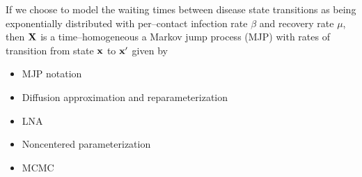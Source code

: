If we choose to model the waiting times between disease state transitions as being exponentially distributed with per--contact infection rate $ \beta $ and recovery rate $ \mu $, then $ \mathbf{X} $ is a time--homogeneous a Markov jump process (MJP) with rates of transition from state $ \mathbf{x} $ to $ \mathbf{x}^\prime $ given by


\begin{itemize}
	\item MJP notation
	\item Diffusion approximation and reparameterization
	\item LNA
	\item Noncentered parameterization
	\item MCMC
\end{itemize}